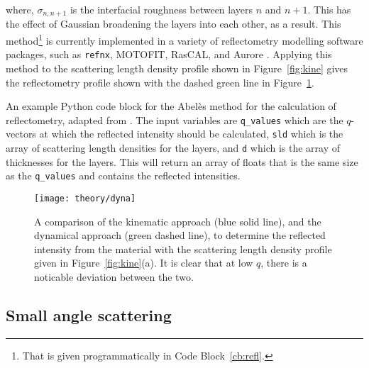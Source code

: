 %
where, $\sigma_{n,n+1}$ is the interfacial roughness between layers $n$ and $n+1$.\autocite{nevot_caracterisation_1980}
This has the effect of Gaussian broadening the layers into each other, as a result.
This method\footnote{That is given programmatically in Code Block~\protect\ref{cb:refl}.} is currently implemented in a variety of reflectometry modelling software packages, such as \texttt{refnx}, MOTOFIT, RasCAL, and Aurore \autocite{nelson_refnx_2019,nelson_co-refinement_2006,hughes_rascal_nodate,gerelli_aurore_2016-1,gerelli_aurore_2016}.
Applying this method to the scattering length density profile shown in Figure~\ref{fig:kine} gives the reflectometry profile shown with the dashed green line in Figure~\ref{fig:dyna}.
%
\begin{listing}
    \centering
    \caption{An example Python code block for the Abel\`{e}s method for the calculation of reflectometry, adapted from \cite{nelson_refnx_2019}. The input variables are \texttt{q\_values} which are the $q$-vectors at which the reflected intensity should be calculated, \texttt{sld} which is the array of scattering length densities for the layers, and \texttt{d} which is the array of thicknesses for the layers. This will return an array of floats that is the same size as the \texttt{q\_values} and contains the reflected intensities.}
    
    \label{cb:refl}
\end{listing}
%
%
\begin{figure}
    \centering
    \texttt{[image: theory/dyna]}
    \caption{A comparison of the kinematic approach (blue solid line), and the dynamical approach (green dashed line), to determine the reflected intensity from the material with the scattering length density profile given in Figure~\protect\ref{fig:kine}(a). It is clear that at low $q$, there is a noticable deviation between the two.}
    \label{fig:dyna}
\end{figure}
%


\subsection{Small angle scattering}
\label{sec:sasanal}


